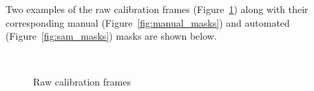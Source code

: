 Two examples of the raw calibration frames (Figure~\ref{fig:raw_frames}) along with their
corresponding manual (Figure~\ref{fig:manual_masks}) and automated (Figure~\ref{fig:sam_masks})
masks are shown below.

\begin{figure}[htbp]
    \centering
    \\[1mm]
    \caption{Raw calibration frames}
    \label{fig:raw_frames}
\end{figure}

